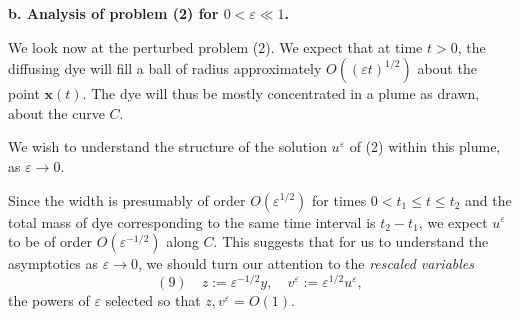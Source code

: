 \begin{example}
\textbf{b. Analysis of problem (2) for $0 < \varepsilon \ll 1$.}

We look now at the perturbed problem (2). We expect that at time $t > 0$, the diffusing dye will fill a ball of radius approximately $O((\varepsilon t)^{1/2})$ about the point $\mathbf{x}(t)$. The dye will thus be mostly concentrated in a plume as drawn, about the curve $C$.

\begin{figure}[h]\centering
\end{figure}

We wish to understand the structure of the solution $u^\varepsilon$ of (2) within this plume, as $\varepsilon \to 0$.

Since the width is presumably of order $O(\varepsilon^{1/2})$ for times $0 < t_1 \leq t \leq t_2$ and the total mass of dye corresponding to the same time interval is $t_2 - t_1$, we expect $u^\varepsilon$ to be of order $O(\varepsilon^{-1/2})$ along $C$. This suggests that for us to understand the asymptotics as $\varepsilon \to 0$, we should turn our attention to the \textit{rescaled variables}
$$(9) \quad z := \varepsilon^{-1/2} y, \quad v^\varepsilon := \varepsilon^{1/2} u^\varepsilon,$$
the powers of $\varepsilon$ selected so that $z, v^\varepsilon = O(1)$.


\end{example}
